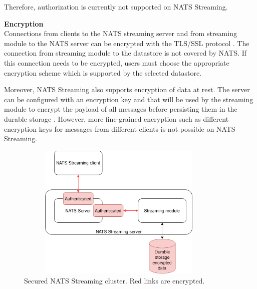 Therefore, authorization is currently not supported on NATS Streaming. 

\textbf{Encryption}\\
Connections from clients to the NATS streaming server and from streaming module to the NATS server can be encrypted with the TLS/SSL protocol \cite{normalnatsconfig}. The connection from streaming module to the datastore is not covered by NATS. If this connection needs to be encrypted, users must choose the appropriate encryption scheme which is supported by the selected datastore.

Moreover, NATS Streaming also supports encryption of data at rest. The server can be configured with an encryption key and that will be used by the streaming module to encrypt the payload of all messages before persisting them in the durable storage \cite{natstoreencryption}. However, more fine-grained encryption such as different encryption keys for messages from different clients is not possible on NATS Streaming.
\begin{figure}[h]
	\centering
	\includegraphics[width=10cm,height=6.5cm]{images/security-nats.png}
	\caption{Secured NATS Streaming cluster. Red links are encrypted.}
	\label{fig:securitynats}
\end{figure}
